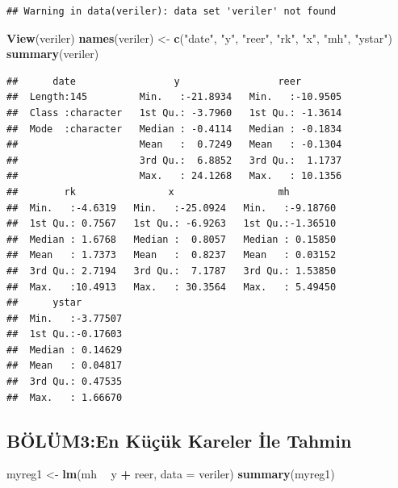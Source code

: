 \documentclass[]{article}
\newenvironment{Shaded}{\begin{snugshade}}{\end{snugshade}}
\newcommand{\KeywordTok}[1]{\textcolor[rgb]{0.13,0.29,0.53}{\textbf{#1}}}
\newcommand{\DataTypeTok}[1]{\textcolor[rgb]{0.13,0.29,0.53}{#1}}
\newcommand{\StringTok}[1]{\textcolor[rgb]{0.31,0.60,0.02}{#1}}
\newcommand{\OperatorTok}[1]{\textcolor[rgb]{0.81,0.36,0.00}{\textbf{#1}}}
\newcommand{\NormalTok}[1]{#1}
\begin{document}
\begin{verbatim}
## Warning in data(veriler): data set 'veriler' not found
\end{verbatim}

\begin{Shaded}
\begin{Highlighting}[]
\KeywordTok{View}\NormalTok{(veriler)}
\KeywordTok{names}\NormalTok{(veriler) <-}\StringTok{ }\KeywordTok{c}\NormalTok{(}\StringTok{"date"}\NormalTok{, }\StringTok{"y"}\NormalTok{, }\StringTok{"reer"}\NormalTok{, }\StringTok{"rk"}\NormalTok{, }\StringTok{"x"}\NormalTok{, }\StringTok{"mh"}\NormalTok{, }\StringTok{"ystar"}\NormalTok{)}
\KeywordTok{summary}\NormalTok{(veriler)}
\end{Highlighting}
\end{Shaded}

\begin{verbatim}
##      date                 y                 reer         
##  Length:145         Min.   :-21.8934   Min.   :-10.9505  
##  Class :character   1st Qu.: -3.7960   1st Qu.: -1.3614  
##  Mode  :character   Median : -0.4114   Median : -0.1834  
##                     Mean   :  0.7249   Mean   : -0.1304  
##                     3rd Qu.:  6.8852   3rd Qu.:  1.1737  
##                     Max.   : 24.1268   Max.   : 10.1356  
##        rk                x                  mh          
##  Min.   :-4.6319   Min.   :-25.0924   Min.   :-9.18760  
##  1st Qu.: 0.7567   1st Qu.: -6.9263   1st Qu.:-1.36510  
##  Median : 1.6768   Median :  0.8057   Median : 0.15850  
##  Mean   : 1.7373   Mean   :  0.8237   Mean   : 0.03152  
##  3rd Qu.: 2.7194   3rd Qu.:  7.1787   3rd Qu.: 1.53850  
##  Max.   :10.4913   Max.   : 30.3564   Max.   : 5.49450  
##      ystar         
##  Min.   :-3.77507  
##  1st Qu.:-0.17603  
##  Median : 0.14629  
##  Mean   : 0.04817  
##  3rd Qu.: 0.47535  
##  Max.   : 1.66670
\end{verbatim}

\subsection{BÖLÜM3:En Küçük Kareler İle
Tahmin}\label{bolum3en-kucuk-kareler-ile-tahmin}

\begin{Shaded}
\begin{Highlighting}[]
\NormalTok{myreg1 <-}\StringTok{ }\KeywordTok{lm}\NormalTok{(mh }\OperatorTok{~}\StringTok{ }\NormalTok{y }\OperatorTok{+}\StringTok{ }\NormalTok{reer, }\DataTypeTok{data =}\NormalTok{ veriler)}
\KeywordTok{summary}\NormalTok{(myreg1)}
\end{Highlighting}
\end{Shaded}
\end{document}
